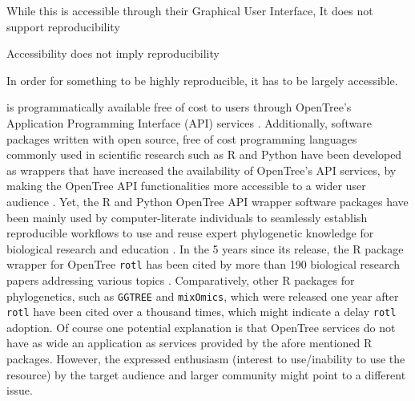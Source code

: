 \documentclass[12pt]{article}
\begin{document}
While this is accessible through their Graphical User Interface,
It does not support reproducibility

Accessibility does not imply reproducibility

In order for something to be highly reproducible, it has to be largely accessible.


is programmatically
available free of cost to users through OpenTree's Application Programming Interface
(API) services \citep{opentreeAPIs}.
Additionally, software packages written with open source, free of cost programming
languages commonly used in scientific research such as R and Python
\citep{baker2017scientific} have been developed as wrappers that have increased the availability
of OpenTree's API services, by making the OpenTree API functionalities more accessible
to a wider user audience \citep{michonneau2016rotl, mctavish2021opentree}.
Yet, the R and Python OpenTree API wrapper software packages have been mainly used
by computer-literate individuals
to seamlessly establish reproducible workflows to use and reuse expert phylogenetic
knowledge for biological research \citep{sanchez2019datelife, sanchez2021physcraper}
and education \citep{nguyen2020phylotastic, phylotasticedtools, galacticedtools}.
In the 5 years since its release, the R package wrapper for OpenTree \texttt{rotl}
has been cited by more than 190 biological research papers addressing various
topics \citep{googlerotl}.
Comparatively, other R packages for phylogenetics, such as \texttt{GGTREE}
and \texttt{mixOmics}, which were released one year after \texttt{rotl} have been
cited over a thousand times, which might indicate a delay \texttt{rotl}
adoption. Of course one potential explanation is that OpenTree services do not have
as wide an application as services provided by the afore mentioned R packages.
However, the
expressed enthusiasm (interest to use/inability to use the resource) by the target
 audience and larger community might point to a different issue.
\end{document}
